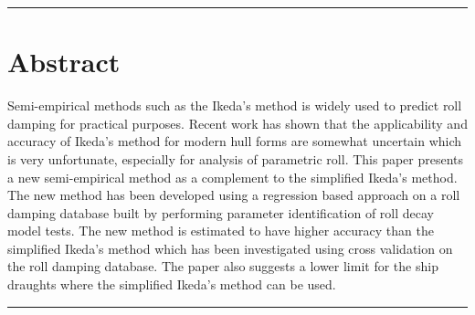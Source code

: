 {\footnotesize
\noindent\rule{\columnwidth}{0.4pt}
\section*{Abstract}\label{se:abstract}

Semi-empirical methods such as the Ikeda’s method is widely used to predict roll damping for practical purposes. Recent work has shown that the applicability and accuracy of Ikeda’s method for modern hull forms are somewhat uncertain which is very unfortunate, especially for analysis of parametric roll. 
This paper presents a new semi-empirical method as a complement to the simplified Ikeda's method. The new method has been developed using a regression based approach on a roll damping database built by performing parameter identification of roll decay model tests. 
The new method is estimated to have higher accuracy than the simplified Ikeda's method which has been investigated using cross validation on the roll damping database. The paper also suggests a lower limit for the ship draughts where the simplified Ikeda's method can be used.


}
\newline
\noindent\rule{\columnwidth}{0.4pt}